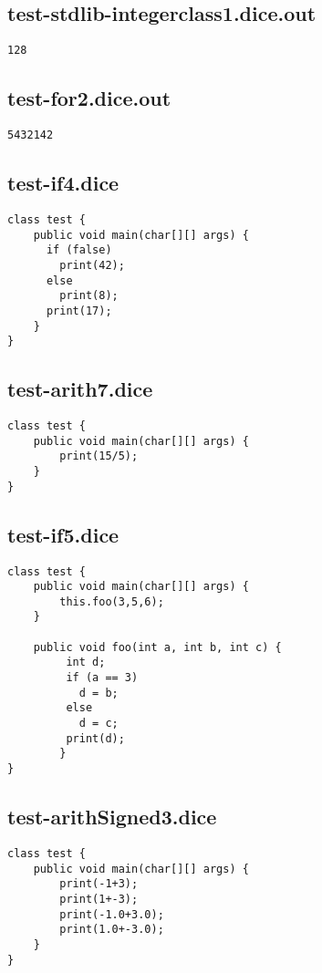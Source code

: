 \subsection{test-stdlib-integerclass1.dice.out}
\begin{verbatim}
128

\end{verbatim}
\pagebreak
\subsection{test-for2.dice.out}
\begin{verbatim}
5432142
\end{verbatim}
\pagebreak
\subsection{test-if4.dice}
\begin{verbatim}
class test {
	public void main(char[][] args) {
	  if (false) 
	  	print(42); 
	  else 
	  	print(8);
  	  print(17);
	}
}

\end{verbatim}
\pagebreak
\subsection{test-arith7.dice}
\begin{verbatim}
class test {
	public void main(char[][] args) {
		print(15/5);
	}
}

\end{verbatim}
\pagebreak
\subsection{test-if5.dice}
\begin{verbatim}
class test {
	public void main(char[][] args) {
		this.foo(3,5,6);
	}

	public void foo(int a, int b, int c) {
		 int d;
		 if (a == 3)
		   d = b;
		 else
		   d = c;
		 print(d);
		}
}

\end{verbatim}
\pagebreak
\subsection{test-arithSigned3.dice}
\begin{verbatim}
class test {
	public void main(char[][] args) {
		print(-1+3);
		print(1+-3);
		print(-1.0+3.0);
		print(1.0+-3.0);
	}
}
\end{verbatim}
\pagebreak
